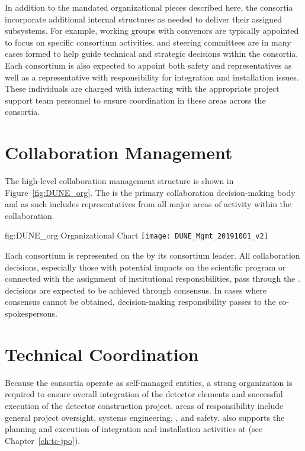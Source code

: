 In addition to the mandated organizational pieces described here, 
the consortia incorporate additional internal structures as needed 
to deliver their assigned subsystems.  For example, working groups 
with convenors are typically appointed to focus on specific consortium 
activities, and steering committees are in many cases formed to help 
guide technical and strategic decisions within the consortia.  Each 
consortium is also expected to appoint both safety and  
representatives as well as a representative with responsibility for 
integration and installation issues.  These individuals are charged 
with interacting  with the appropriate project support team 
personnel to ensure coordination in these areas across the consortia.        

\section{ Collaboration Management}
\label{sec:dune_mgmt}

The high-level  collaboration management structure is 
shown in Figure~\ref{fig:DUNE_org}.  The   is 
the primary collaboration decision-making body and as such includes 
representatives from all major areas of activity within the 
collaboration.
\begin{dunefigure}{fig:DUNE_org}
  { Organizational Chart}
  \texttt{[image: DUNE\_Mgmt\_20191001\_v2]}
\end{dunefigure}

Each consortium is represented on the   by its 
consortium leader.  All collaboration decisions, especially those with 
potential impacts on the  scientific program or connected 
with the assignment of institutional responsibilities, pass through the 
.   decisions are expected to be achieved through 
consensus.  In cases where consensus cannot be obtained, decision-making 
responsibility passes to the co-spokespersons.

\section{Technical Coordination}
\label{sec:tc}

Because the consortia operate as self-managed entities, a strong
 organization is required to ensure overall integration 
of the detector elements and successful execution of the detector
construction project.   areas of responsibility include 
general project oversight, systems engineering, , and 
safety.   also supports the planning and execution 
of integration and installation activities at  (see 
Chapter~\ref{ch:tc-jpo}).  

